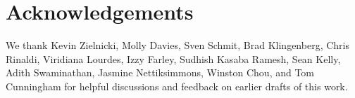 \section*{Acknowledgements}

We thank Kevin Zielnicki, Molly Davies, Sven Schmit, Brad Klingenberg, Chris Rinaldi, Viridiana Lourdes, Izzy Farley, Sudhish Kasaba Ramesh, Sean Kelly, Adith Swaminathan, Jasmine Nettiksimmons, Winston Chou, and Tom Cunningham for helpful discussions and feedback on earlier drafts of this work.
